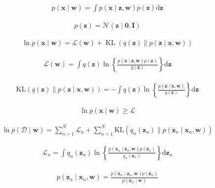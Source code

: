 \documentclass{article}
\begin{document}
\begin{align*}
p(\mathbf{x} \mid \mathbf{w})=\int p(\mathbf{x} \mid \mathbf{z}, \mathbf{w}) p(\mathbf{z}) \mathrm{d} \mathbf{z} 
\tag{19.4}
\end{align*}

\begin{align*}
p(\mathbf{z})=\mathcal{N}(\mathbf{z} \mid \mathbf{0}, \mathbf{I}) 
\tag{19.5}
\end{align*}

\begin{align*}
\ln p(\mathbf{x} \mid \mathbf{w})=\mathcal{L}(\mathbf{w})+\operatorname{KL}(q(\mathbf{z}) \| p(\mathbf{z} \mid \mathbf{x}, \mathbf{w})) 
\tag{19.6}
\end{align*}

\begin{align*}
\mathcal{L}(\mathbf{w})=\int q(\mathbf{z}) \ln \left\{\frac{p(\mathbf{x} \mid \mathbf{z}, \mathbf{w}) p(\mathbf{z})}{q(\mathbf{z})}\right\} \mathrm{d} \mathbf{z} 
\tag{19.7}
\end{align*}

\begin{align*}
\mathrm{KL}(q(\mathbf{z}) \| p(\mathbf{z} \mid \mathbf{x}, \mathbf{w}))=-\int q(\mathbf{z}) \ln \left\{\frac{p(\mathbf{z} \mid \mathbf{x}, \mathbf{w})}{q(\mathbf{z})}\right\} \mathrm{d} \mathbf{z} 
\tag{19.8}
\end{align*}

\begin{align*}
\ln p(\mathbf{x} \mid \mathbf{w}) \geqslant \mathcal{L} 
\tag{19.9}
\end{align*}

\begin{align*}
\ln p(\mathcal{D} \mid \mathbf{w})=\sum_{n=1}^{N} \mathcal{L}_{n}+\sum_{n=1}^{N} \mathrm{KL}\left(q_{n}\left(\mathbf{z}_{n}\right) \| p\left(\mathbf{z}_{n} \mid \mathbf{x}_{n}, \mathbf{w}\right)\right) 
\tag{19.10}
\end{align*}

\begin{align*}
\mathcal{L}_{n}=\int q_{n}\left(\mathbf{z}_{n}\right) \ln \left\{\frac{p\left(\mathbf{x}_{n} \mid \mathbf{z}_{n}, \mathbf{w}\right) p\left(\mathbf{z}_{n}\right)}{q_{n}\left(\mathbf{z}_{n}\right)}\right\} \mathrm{d} \mathbf{z}_{n} 
\tag{19.11}
\end{align*}

\begin{align*}
p\left(\mathbf{z}_{n} \mid \mathbf{x}_{n}, \mathbf{w}\right)=\frac{p\left(\mathbf{x}_{n} \mid \mathbf{z}_{n}, \mathbf{w}\right) p\left(\mathbf{z}_{n}\right)}{p\left(\mathbf{x}_{n} \mid \mathbf{w}\right)} 
\tag{19.12}
\end{align*}
\end{document}
